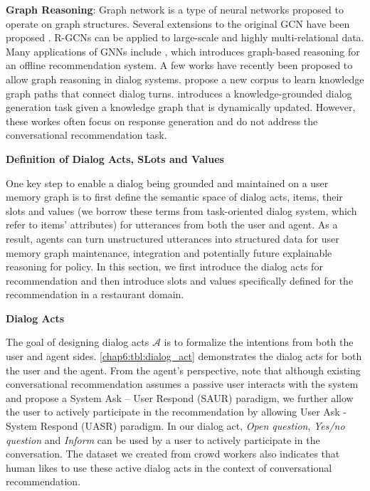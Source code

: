 \noindent \textbf{Graph Reasoning}:
Graph network \cite{scarselli2008graph,duvenaud2015convolutional,defferrard2016convolutional,kipf2016semi} is a type of neural networks proposed to operate on graph structures. 
Several extensions to the original GCN have been proposed \cite{li2015gated,pham2017column}.
R-GCNs \cite{schlichtkrull2018modeling} can be applied to large-scale and highly multi-relational data.
Many applications of GNNs include \cite{Xian2019ReinforcementKG}, which introduces graph-based reasoning for an offline recommendation system.
A few works have recently been proposed to allow graph reasoning in dialog systems.
\cite{Moon+19a, Moon+19b} propose a new corpus to learn knowledge graph paths that connect dialog turns.
\cite{tuan-etal-2019-dykgchat} introduces a knowledge-grounded dialog generation task given a knowledge graph that is dynamically updated.
However, these workes often focus on response generation and do not address the conversational recommendation task.


\textbf{Definition of Dialog Acts, SLots and Values}

\label{chap6:sec:form}
One key step to enable a dialog being grounded and maintained on a user memory graph is to first define the semantic space of dialog acts, items, their slots and values (we borrow these terms from task-oriented dialog system, which refer to items' attributes) for utterances from both the user and agent.
As a result, agents can turn unstructured utterances into structured data for user memory graph maintenance, integration and potentially future explainable reasoning for policy.
In this section, we first introduce the dialog acts for recommendation and then introduce slots and values specifically defined for the recommendation in a restaurant domain.

\textbf{Dialog Acts}
\label{chap6:sec:dialog_act}

The goal of designing dialog acts $\mathcal{A}$ is to formalize the intentions from both the user and agent sides. 
\ref{chap6:tbl:dialog_act} demonstrates the dialog acts for both the user and the agent.
From the agent's perspective, 
note that although existing conversational recommendation\cite{sun2018conversational,li2018towards,zhang2018towards} assumes a passive user interacts with the system and propose a System Ask – User Respond (SAUR) paradigm, we further allow the user to actively participate in the recommendation by allowing User Ask - System Respond (UASR) paradigm. In our dialog act, \textit{Open question}, \textit{Yes/no question} and \textit{Inform} can be used by a user to actively participate in the conversation. The dataset we created from crowd workers also indicates that human likes to use these active dialog acts in the context of conversational recommendation.


